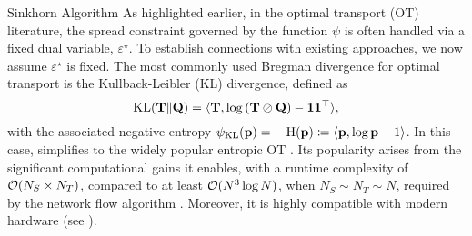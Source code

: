 \begin{mem1}{Sinkhorn Algorithm}\label{mem:sinkhorn}
    As highlighted earlier, in the optimal transport (OT) literature, the spread constraint governed by the function $\psi$ is often handled via a fixed dual variable, $\varepsilon^\star$. To establish connections with existing approaches, we now assume $\varepsilon^\star$ is fixed. The most commonly used Bregman divergence for optimal transport is the Kullback-Leibler (KL) divergence, defined as
    \[
    \operatorname{KL}({\mathbf{T}} \| {\mathbf{Q}}) = \langle {\mathbf{T}}, \log \left( {\mathbf{T}} \oslash {\mathbf{Q}} \right) - \bm{1} \bm{1}^\top \rangle,
    \]
    with the associated negative entropy $\psi_{\operatorname{KL}}(\mathbf{p}) = - \operatorname{H}({\mathbf{p}}) \coloneqq \langle \mathbf{p}, \log \mathbf{p} - 1 \rangle$.
    In this case,  simplifies to the widely popular entropic OT \citep{cuturi2013sinkhorn}. Its popularity arises from the significant computational gains it enables, with a runtime complexity of ${\mathcal{O}}(N_S \times N_T)$, compared to at least ${\mathcal{O}}(N^3 \log N)$, when $N_S \sim N_T \sim N$, required by the network flow algorithm \citep{peyre2019computational}. Moreover, it is highly compatible with modern hardware (see ).
    

\end{mem1}
